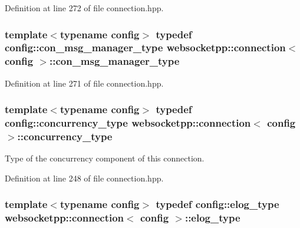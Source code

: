 Definition at line 272 of file connection.\+hpp.

\hypertarget{classwebsocketpp_1_1connection_aa3fe3ecba9c63a04771c2ae34dd8dd56}{}
\subsubsection[{con\+\_\+msg\+\_\+manager\+\_\+type}]{\setlength{\rightskip}{0pt plus 5cm}template$<$typename config$>$ typedef config\+::con\+\_\+msg\+\_\+manager\+\_\+type {\bf websocketpp\+::connection}$<$ config $>$\+::{\bf con\+\_\+msg\+\_\+manager\+\_\+type}}\label{classwebsocketpp_1_1connection_aa3fe3ecba9c63a04771c2ae34dd8dd56}


Definition at line 271 of file connection.\+hpp.

\hypertarget{classwebsocketpp_1_1connection_a9db8af56881450fbba5c6ff1060c569a}{}
\subsubsection[{concurrency\+\_\+type}]{\setlength{\rightskip}{0pt plus 5cm}template$<$typename config$>$ typedef config\+::concurrency\+\_\+type {\bf websocketpp\+::connection}$<$ config $>$\+::{\bf concurrency\+\_\+type}}\label{classwebsocketpp_1_1connection_a9db8af56881450fbba5c6ff1060c569a}


Type of the concurrency component of this connection. 



Definition at line 248 of file connection.\+hpp.

\hypertarget{classwebsocketpp_1_1connection_a80314ab2e4ddefdd4783fb1934fedee6}{}
\subsubsection[{elog\+\_\+type}]{\setlength{\rightskip}{0pt plus 5cm}template$<$typename config$>$ typedef config\+::elog\+\_\+type {\bf websocketpp\+::connection}$<$ config $>$\+::{\bf elog\+\_\+type}}\label{classwebsocketpp_1_1connection_a80314ab2e4ddefdd4783fb1934fedee6}


